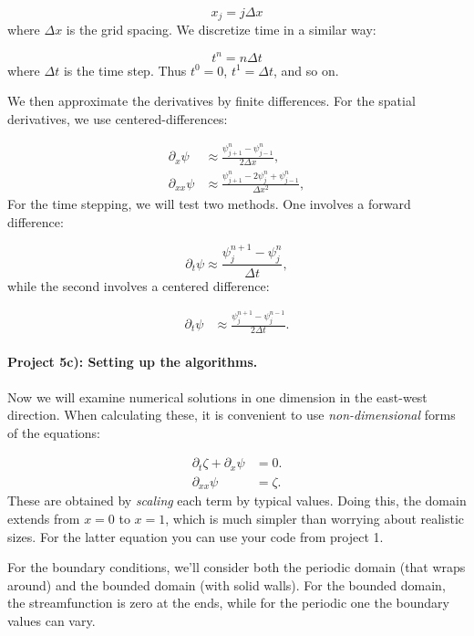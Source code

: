 \documentclass[%
oneside,                 %
final,                   %
10pt]{article}
\begin{document}
\begin{equation}
x_j = j\Delta x
\end{equation}
where $\Delta x$ is the grid spacing. We discretize time in a similar way:

\begin{equation}
t^n = n\Delta t
\end{equation}
where $\Delta t$ is the time step. Thus $t^0=0$, $t^1=\Delta t$, and so on.

We then approximate the derivatives by finite differences. For
the spatial derivatives, we use centered-differences:

\begin{align}
	\partial_x\psi &\approx \frac{\psi_{j+1}^{n} - \psi_{j-1}^{n}}{2\Delta x}, \\
	\partial_{xx}\psi &\approx \frac{\psi_{j+1}^{n} - 2\psi_{j}^{n} + \psi_{j-1}^{n}}{\Delta x^2},
\end{align}
For the time stepping, we will test two methods. One involves a
forward difference:

\begin{equation}
  \label{eq:Rossby3}
  \partial_t\psi \approx \frac{\psi_{j}^{n+1} - \psi_{j}^{n}}{\Delta t} ,
\end{equation}
while the second involves a centered difference:

\begin{align}
  \label{eq:Rossby4}
	\partial_t\psi &\approx \frac{\psi_{j}^{n+1} - \psi_{j}^{n-1}}{2\Delta t}.
\end{align}

\paragraph{Project 5c): Setting up the algorithms.}
Now we will examine 
numerical solutions in one dimension in the east-west
direction. When calculating these, it is convenient to use
\emph{non-dimensional} forms of the equations:

\begin{align}
	\partial_t\zeta + \partial_x\psi &= 0. \\
	\partial_{xx}\psi &= \zeta.
\end{align}
These are obtained by \emph{scaling} each term by typical values.
Doing this, the domain extends from $x=0$ to $x=1$, which is
much simpler than worrying about realistic sizes.   For the latter equation you can use your code from project 1. 

For the boundary conditions, we'll consider both the periodic
domain (that wraps around) and the bounded domain (with solid
walls). For the bounded domain, the streamfunction is zero at the
ends, while for the periodic one the boundary values can vary.
\end{document}
